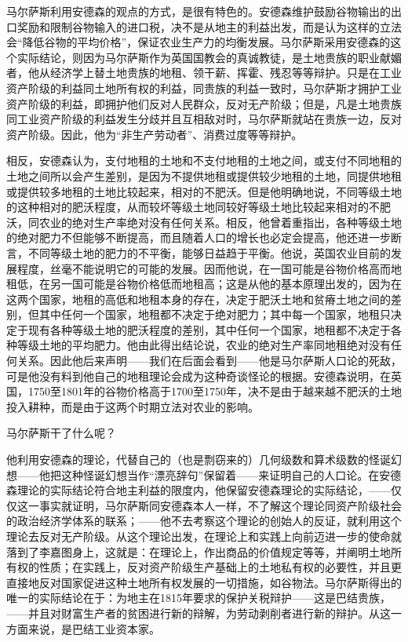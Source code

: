 马尔萨斯利用安德森的观点的方式，是很有特色的。安德森维护鼓励谷物输出的出口奖励和限制谷物输入的进口税，决不是从地主的利益出发，而是认为这样的立法会“降低谷物的平均价格”，保证农业生产力的均衡发展。马尔萨斯采用安德森的这个实际结论，则因为马尔萨斯作为英国国教会的真诚教徒，是土地贵族的职业献媚者，他从经济学上替土地贵族的地租、领干薪、挥霍、残忍等等辩护。只是在工业资产阶级的利益同土地所有权的利益，同贵族的利益一致时，马尔萨斯才拥护工业资产阶级的利益，即拥护他们反对人民群众，反对无产阶级；但是，凡是土地贵族同工业资产阶级的利益发生分歧并且互相敌对时，马尔萨斯就站在贵族一边，反对资产阶级。因此，他为“非生产劳动者”、消费过度等等辩护。

相反，安德森认为，支付地租的土地和不支付地租的土地之间，或支付不同地租的土地之间所以会产生差别，是因为不提供地租或提供较少地租的土地，同提供地租或提供较多地租的土地比较起来，相对的不肥沃。但是他明确地说，不同等级土地的这种相对的肥沃程度，从而较坏等级土地同较好等级土地比较起来相对的不肥沃，同农业的绝对生产率绝对没有任何关系。相反，他曾着重指出，各种等级土地的绝对肥力不但能够不断提高，而且随着人口的增长也必定会提高，他还进一步断言，不同等级土地的肥力的不平衡，能够日益趋于平衡。他说，英国农业目前的发展程度，丝毫不能说明它的可能的发展。因而他说，在一国可能是谷物价格高而地租低，在另一国可能是谷物价格低而地租高；这是从他的基本原理出发的，因为在这两个国家，地租的高低和地租本身的存在，决定于肥沃土地和贫瘠土地之间的差别，但其中任何一个国家，地租都不决定于绝对肥力；其中每一个国家，地租只决定于现有各种等级土地的肥沃程度的差别，其中任何一个国家，地租都不决定于各种等级土地的平均肥力。他由此得出结论说，农业的绝对生产率同地租绝对没有任何关系。因此他后来声明——我们在后面会看到——他是马尔萨斯人口论的死敌，可是他没有料到他自己的地租理论会成为这种奇谈怪论的根据。安德森说明，在英国，1750至1801年的谷物价格高于1700至1750年，决不是由于越来越不肥沃的土地投入耕种，而是由于这两个时期立法对农业的影响。

马尔萨斯干了什么呢？

他利用安德森的理论，代替自己的（也是剽窃来的）几何级数和算术级数的怪诞幻想——他把这种怪诞幻想当作“漂亮辞句”保留着——来证明自己的人口论。在安德森理论的实际结论符合地主利益的限度内，他保留安德森理论的实际结论，——仅仅这一事实就证明，马尔萨斯同安德森本人一样，不了解这个理论同资产阶级社会的政治经济学体系的联系；——他不去考察这个理论的创始人的反证，就利用这个理论去反对无产阶级。从这个理论出发，在理论上和实践上向前迈进一步的使命就落到了李嘉图身上，这就是：在理论上，作出商品的价值规定等等，并阐明土地所有权的性质；在实践上，反对资产阶级生产基础上的土地私有权的必要性，并且更直接地反对国家促进这种土地所有权发展的一切措施，如谷物法。马尔萨斯得出的唯一的实际结论在于：为地主在1815年要求的保护关税辩护——这是巴结贵族，——并且对财富生产者的贫困进行新的辩解，为劳动剥削者进行新的辩护。从这一方面来说，是巴结工业资本家。

